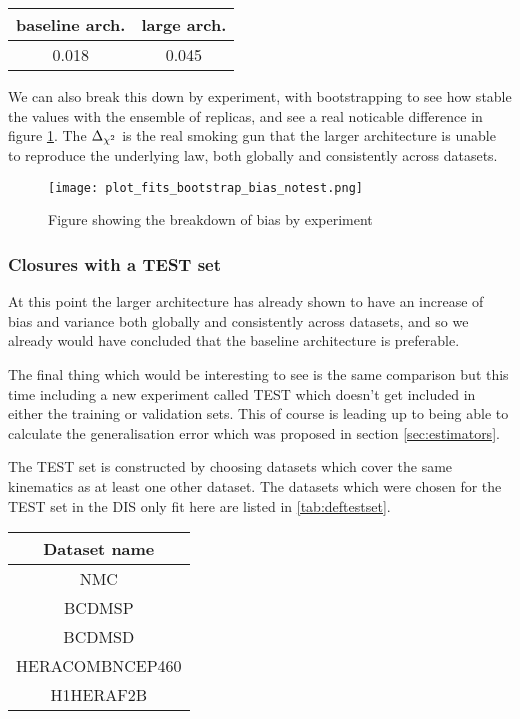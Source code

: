 \begin{center}
    \begin{tabular}{ |c|c| }
     \hline
     baseline arch. & large arch.  \\
     \hline\hline
     0.018 & 0.045 \\
     \hline
    \end{tabular}\label{tab:totbiasnotest}
\end{center}

We can also break this down by experiment, with bootstrapping to see how
stable the values with the ensemble of replicas, and see a real noticable difference
in figure \ref{fig:no_test_bias_exp}. The $\Delta_{\chi^{2}}$ is the real smoking gun that
the larger architecture is unable to reproduce the underlying law, both
globally and consistently across datasets.

\begin{figure}[!h]
    \centering
    \texttt{[image: plot\_fits\_bootstrap\_bias\_notest.png]}
    \caption{Figure showing the breakdown of bias by experiment}
    \label{fig:no_test_bias_exp}
\end{figure}

\subsubsection*{Closures with a TEST set}

At this point the larger architecture has already shown to have an increase
of bias and variance both globally and consistently across datasets, and so
we already would have concluded that the baseline architecture is preferable.

The final thing which would be interesting to see is the same comparison but
this time including a new experiment called TEST which doesn't get included
in either the training or validation sets. This of course is leading up to
being able to calculate the generalisation error which was proposed in section
\ref{sec:estimators}.

The TEST set is constructed by choosing datasets which cover the same kinematics
as at least one other dataset. The datasets which were chosen for the TEST set
in the DIS only fit here are listed in \ref{tab:deftestset}.

\begin{center}
    \begin{tabular}{ |c| }
        \hline
        Dataset name \\
        \hline\hline
        NMC \\
        BCDMSP \\
        BCDMSD \\
        HERACOMBNCEP460 \\
        H1HERAF2B \\
        \hline
   \end{tabular}\label{tab:deftestset}
\end{center}

